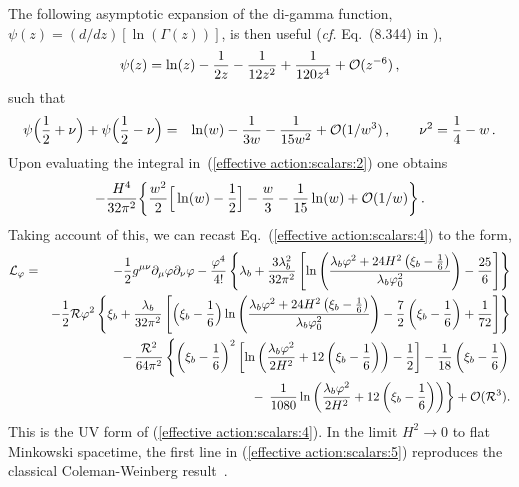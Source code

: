 The following asymptotic expansion of the di-gamma function,
$\psi(z) = (d/dz)[\ln(\Gamma(z))]$, is then useful ({\it cf.}
Eq.~(8.344) in \cite{GradshteynRyzhik:1965}),
\begin{equation}
  \psi(z) = \ln(z) - \frac{1}{2z} - \frac{1}{12z^2}
            + \frac{1}{120z^4} + {\cal O}(z^{-6})
\,,
\label{psi:asymptotic:0}
\end{equation}
such that
\begin{eqnarray}
 \psi\Big(\frac 12 + \nu\Big) + \psi\Big(\frac 12 - \nu\Big)
  &=& \ln(w) - \frac{1}{3w} - \frac{1}{15w^2} + {\cal O}(1/w^{3})
\,,\qquad \nu^2 = \frac14 - w
\,.
\label{psi:asymptotic expansion}
\end{eqnarray}
Upon evaluating the integral in~(\ref{effective action:scalars:2})
one obtains
\begin{equation}
 -\frac{H^4}{32\pi^2}
   \bigg\{
          \frac{w^2}{2}\Big[\ln(w)-\frac12\Big]
       -  \frac{w}{3}
       -  \frac{1}{15}\ln(w) + {\cal O}(1/w)
   \bigg\}
\,.
\end{equation}
Taking account of this, we can recast Eq.~(\ref{effective action:scalars:4})
to the form,
\begin{eqnarray}
 {\cal L}_\varphi
  &=& -\frac12g^{\mu\nu}\partial_\mu\varphi\partial_\nu\varphi
      - \frac{\varphi^4}{4!}\left\{\lambda_b+\frac{3\lambda_b^{2}}{32\pi^{2}}
      \left[\ln\left(\frac{\lambda_b\varphi^{2}+24H^{2}
      \left(\xi_b-\frac16\right)}{\lambda_b\varphi_0^{2}}\right)-\frac{25}{6}\right]\right\}
\nonumber\\
  & & -\frac12{\cal R}\varphi^2\left\{\xi_b+\frac{\lambda_b}{32\pi^{2}}\left[\Big(\xi_b-\frac16\Big)
                       \ln\left(\frac{\lambda_b\varphi^{2}+24H^{2}\left(\xi_b-\frac16\right)}{\lambda_b\varphi_0^{2}}\right)
                       -\frac72\left(\xi_b-\frac16\right)+\frac{1}{72}\right]\right\}
\label{effective action:scalars:5}
\nonumber\\
& &\hskip 0.cm
    -\, \frac{{\cal R}^2}{64\pi^2}
             \left\{
               \left(\xi_b-\frac16\right)^2
                   \left[\ln\left(\frac{\lambda_b\varphi^2}{2H^{2}}
                         +12\left(\xi_b-\frac16\right)\right)
                         -\frac12
                   \right]
             -\frac{1}{18}\left(\xi_b-\frac16\right)\right.
\nonumber\\
& &
             -\, \left.\frac{1}{1080}\ln\left(\frac{\lambda_b\varphi^2}{2H^{2}}
             +12\left(\xi_b-\frac16\right)\right)\right\}+{\cal O}({\cal R}^3).
\end{eqnarray}
This is the UV form of (\ref{effective action:scalars:4}). In the
limit $H^2\rightarrow 0$ to flat Minkowski spacetime, the first
line in (\ref{effective action:scalars:5}) reproduces the
classical Coleman-Weinberg result~\cite{ColemanWeinberg:1973}.

